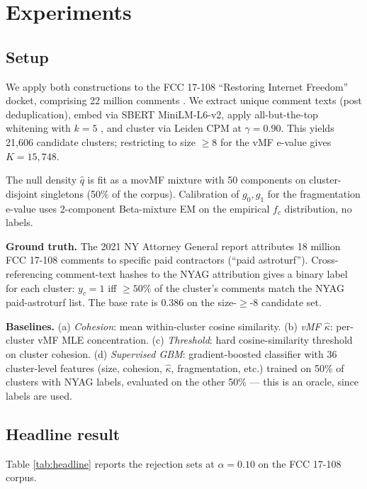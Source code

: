 \documentclass{article}
\theoremstyle{definition}
\theoremstyle{remark}
\begin{document}
\section{Experiments}
\label{sec:experiments}

\subsection{Setup}

We apply both constructions to the FCC 17-108 ``Restoring Internet Freedom'' docket, comprising 22 million comments \citep{handannader2024}. We extract unique comment texts (post deduplication), embed via SBERT MiniLM-L6-v2, apply all-but-the-top whitening with $k = 5$ \citep{mu2018}, and cluster via Leiden CPM at $\gamma = 0.90$. This yields 21{,}606 candidate clusters; restricting to size $\ge 8$ for the vMF e-value gives $K = 15{,}748$.

The null density $\hat q$ is fit as a movMF mixture with 50 components on cluster-disjoint singletons (50\% of the corpus). Calibration of $g_0, g_1$ for the fragmentation e-value uses 2-component Beta-mixture EM on the empirical $f_c$ distribution, no labels.

\textbf{Ground truth.} The 2021 NY Attorney General report \citep{nyag2021} attributes 18 million FCC 17-108 comments to specific paid contractors (``paid astroturf''). Cross-referencing comment-text hashes to the NYAG attribution gives a binary label for each cluster: $y_c = 1$ iff $\ge 50\%$ of the cluster's comments match the NYAG paid-astroturf list. The base rate is $0.386$ on the size-$\ge$-8 candidate set.

\textbf{Baselines.} (a) \emph{Cohesion}: mean within-cluster cosine similarity. (b) \emph{vMF $\hat\kappa$}: per-cluster vMF MLE concentration. (c) \emph{Threshold}: hard cosine-similarity threshold on cluster cohesion. (d) \emph{Supervised GBM}: gradient-boosted classifier with 36 cluster-level features (size, cohesion, $\hat\kappa$, fragmentation, etc.) trained on 50\% of clusters with NYAG labels, evaluated on the other 50\% --- this is an oracle, since labels are used.

\subsection{Headline result}

Table \ref{tab:headline} reports the rejection sets at $\alpha = 0.10$ on the FCC 17-108 corpus.
\end{document}
